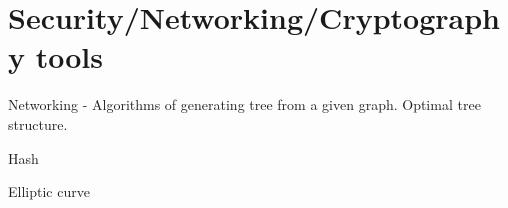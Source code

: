 \chapter{Security/Networking/Cryptography tools} %
\label{cha:Security/Networking/Cryptography tools}


Networking - Algorithms of generating tree from a given graph. Optimal tree structure.

Hash

Elliptic curve